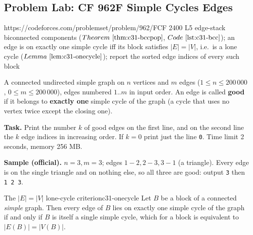 \subsection{Problem Lab: CF 962F Simple Cycles Edges}

  {https://codeforces.com/problemset/problem/962/F}{CF 2400 L5}
  {edge-stack biconnected components (\(\thmref{c31-bccpop}\), \(\coderef{c31-bcc}\)); an edge is on
   exactly one simple cycle iff its block satisfies \(|E|=|V|\), i.e.\ is a lone cycle
   (\(\lemref{c31-onecycle}\)); report the sorted edge indices of every such block}

\begin{problemstatement}
A connected undirected simple graph on \(n\) vertices and \(m\) edges
(\(1\le n\le 200\,000\), \(0\le m\le 200\,000\)), edges numbered \(1..m\) in input order.
An edge is called \textbf{good} if it belongs to \textbf{exactly one} simple cycle of the
graph (a cycle that uses no vertex twice except the closing one).

\textbf{Task.} Print the number \(k\) of good edges on the first line, and on the second
line the \(k\) edge indices in increasing order.  If \(k=0\) print just the line \texttt{0}.
Time limit 2 seconds, memory 256 MB.

\textbf{Sample (official).} \(n{=}3,m{=}3\); edges \(1\!-\!2,2\!-\!3,3\!-\!1\) (a triangle).
Every edge is on the single triangle and on nothing else, so all three are good:
output \texttt{3} then \texttt{1 2 3}.
\end{problemstatement}

\begin{lemma}{The \(|E|=|V|\) lone-cycle criterion}{c31-onecycle}
Let \(B\) be a block of a connected \emph{simple} graph.  Then every edge of \(B\) lies on
exactly one simple cycle of the graph if and only if \(B\) is itself a single simple cycle,
which for a block is equivalent to \(|E(B)|=|V(B)|\).
\end{lemma}

